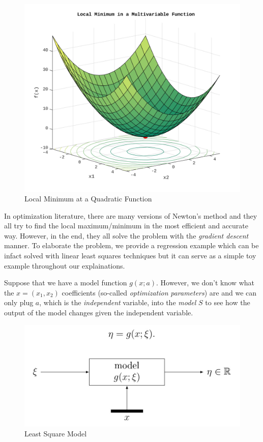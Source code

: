 \documentclass[a4paper]{report}
\numberwithin{figure}{section}
\begin{document}
\begin{figure}[H]
	\centering
	\includegraphics[width=\linewidth,natwidth=640,natheight=640]
	{fig/lsq_multivariable_function_example.jpg}
	\caption{Local Minimum at a Quadratic Function}
	\label{fig:lsq_multivariable_function_example}
\end{figure}


In optimization literature,
there are many versions of Newton's method 
and they all try to find the
local maximum/minimum in the most efficient and accurate way.
However, in the end, they all solve the problem
with the \textit{gradient descent} manner.
To elaborate the problem, we provide a regression example 
which can be infact solved with linear least squares techniques but it can serve 
as a simple toy example throughout our explainations.

Suppose that we have a model function $g(x;a)$. However,
we don't know what the $x=(x_1,x_2)$ coefficients (so-called
\textit{optimization} \textit{parameters}) are and we can only
plug $a$, which is the \textit{independent} variable, into the
\textit{model} $S$ to see
how the output of the model changes given the independent variable. 

\begin{figure}[H]
	\includegraphics[width=0.8\linewidth,natwidth=640,natheight=640]
	{fig/lsq_model.jpg}
	\centering
	\caption{Least Square Model}
	\label{fig:lsq_model}
\end{figure}
\end{document}
